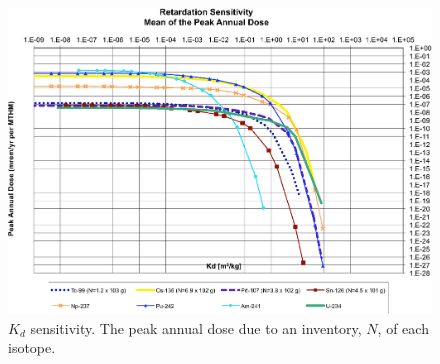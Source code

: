 \begin{figure}[ht]
\centering
\includegraphics[width=0.7\linewidth]{./chapters/nuclide_sensitivity/clay/Sorption/Retardation_Summary_kd.eps}
\caption{$K_d$ sensitivity.  The peak annual dose due to an inventory, 
$N$, of each isotope.}
\label{fig:KdSum}
\end{figure}

\FloatBarrier
